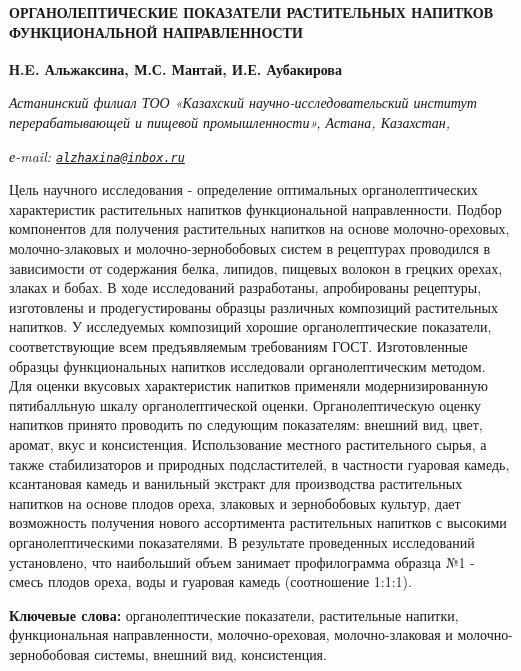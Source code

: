 \begin{articleheader}
{\bfseries ОРГАНОЛЕПТИЧЕСКИЕ ПОКАЗАТЕЛИ РАСТИТЕЛЬНЫХ НАПИТКОВ ФУНКЦИОНАЛЬНОЙ НАПРАВЛЕННОСТИ}

{\bfseries
Н.E. Альжаксина\textsuperscript{\envelope },
М.С. Мантай,
И.Е. Аубакирова}
\end{articleheader}

\begin{affiliation}
\emph{Астанинский филиал ТОО «Казахский научно-исследовательский институт перерабатывающей и пищевой промышленности», Астана, Казахстан,}

\emph{е-mail: \href{mailto:alzhaxina@inbox.ru}{\nolinkurl{alzhaxina@inbox.ru}}}
\end{affiliation}

Цель научного исследования - определение оптимальных органолептических
характеристик растительных напитков функциональной направленности.
Подбор компонентов для получения растительных напитков на основе
молочно-ореховых, молочно-злаковых и молочно-зернобобовых систем в
рецептурах проводился в зависимости от содержания белка, липидов,
пищевых волокон в грецких орехах, злаках и бобах. В ходе исследований
разработаны, апробированы рецептуры, изготовлены и продегустированы
образцы различных композиций растительных напитков. У исследуемых
композиций хорошие органолептические показатели, соответствующие всем
предъявляемым требованиям ГОСТ. Изготовленные образцы функциональных
напитков исследовали органолептическим методом. Для оценки вкусовых
характеристик напитков применяли модернизированную пятибалльную шкалу
органолептической оценки. Органолептическую оценку напитков принято
проводить по следующим показателям: внешний вид, цвет, аромат, вкус и
консистенция. Использование местного растительного сырья, а также
стабилизаторов и природных подсластителей, в частности гуаровая камедь,
ксантановая камедь и ванильный экстракт для производства растительных
напитков на основе плодов ореха, злаковых и зернобобовых культур, дает
возможность получения нового ассортимента растительных напитков с
высокими органолептическими показателями. В результате проведенных
исследований установлено, что наибольший объем занимает профилограмма
образца №1 - смесь плодов ореха, воды и гуаровая камедь (соотношение
1:1:1).

{\bfseries Ключевые слова:} органолептические показатели, растительные
напитки, функциональная направленности, молочно-ореховая,
молочно-злаковая и молочно-зернобобовая системы, внешний вид,
консистенция.

